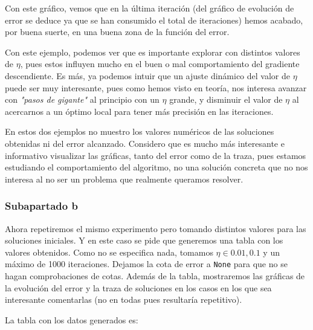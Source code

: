 \documentclass[11pt]{article}
\begin{document}
Con este gráfico, vemos que en la última iteración (del gráfico de evolución de error se deduce ya que se han consumido el total de iteraciones) hemos acabado, por buena suerte, en una buena zona de la función del error.

Con este ejemplo, podemos ver que es importante explorar con distintos valores de $\eta$, pues estos influyen mucho en el buen o mal comportamiento del gradiente descendiente. Es más, ya podemos intuir que un ajuste dinámico del valor de $\eta$ puede ser muy interesante, pues como hemos visto en teoría, nos interesa avanzar con \emph{"pasos de gigante"} al principio con un $\eta$ grande, y disminuir el valor de $\eta$ al acercarnos a un óptimo local para tener más precisión en las iteraciones.

En estos dos ejemplos no muestro los valores numéricos de las soluciones obtenidas ni del error alcanzado. Considero que es mucho más interesante e informativo visualizar las gráficas, tanto del error como de la traza, pues estamos estudiando el comportamiento del algoritmo, no una solución concreta que no nos interesa al no ser un problema que realmente queramos resolver.

\subsubsection{Subapartado b}

Ahora repetiremos el mismo experimento pero tomando distintos valores para las soluciones iniciales. Y en este caso se pide que generemos una tabla con los valores obtenidos. Como no se especifica nada, tomamos $\eta \in {0.01, 0.1}$ y un máximo de 1000 iteraciones. Dejamos la cota de error a \lstinline{None} para que no se hagan comprobaciones de cotas. Además de la tabla, mostraremos las gráficas de la evolución del error y la traza de soluciones en los casos en los que sea interesante comentarlas (no en todas pues resultaría repetitivo).

La tabla con los datos generados es:
\end{document}
